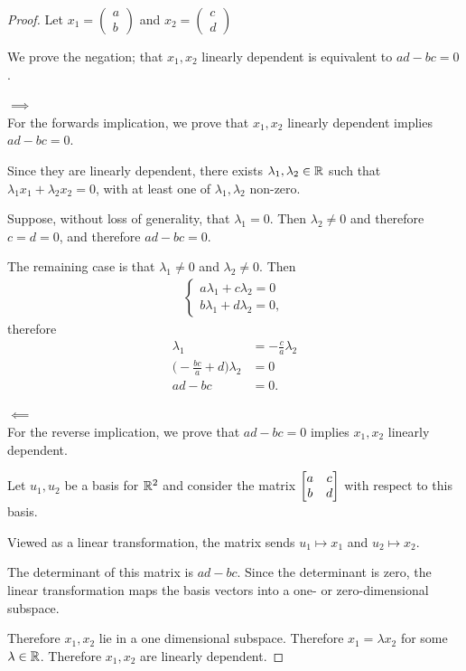 \documentclass[12pt]{article}
\begin{document}
\renewcommand{\cvec}[2]{\begin{pmatrix}#1\\#2\end{pmatrix}}

\begin{proof}
Let $x_1 = \cvec{a}{b}$ and $x_2 = \cvec{c}{d}$

We prove the negation; that $x_1, x_2$ linearly dependent is equivalent to
$ad - bc = 0$.

$\implies$\\
For the forwards implication, we prove that $x_1, x_2$ linearly dependent
implies $ad - bc = 0$.

Since they are linearly dependent, there exists $\lambda_1, \lambda_2 \in \mathbb{R}$
such that $\lambda_1x_1 + \lambda_2x_2 = 0$, with at least one of
$\lambda_1, \lambda_2$ non-zero.

Suppose, without loss of generality, that $\lambda_1 = 0$. Then
$\lambda_2 \neq 0$ and therefore $c = d = 0$, and therefore $ad - bc = 0$.

The remaining case is that $\lambda_1 \neq 0$ and $\lambda_2 \neq 0$. Then
\begin{align*}
  \begin{cases}
    a\lambda_1 + c\lambda_2 = 0\\
    b\lambda_1 + d\lambda_2 = 0,
  \end{cases}
\end{align*}
therefore
\begin{align*}
  \lambda_1                            &= -\frac{c}{a}\lambda_2\\
  \Big(-\frac{bc}{a} + d\Big)\lambda_2 &= 0\\
  ad - bc                              &= 0.
\end{align*}

$\impliedby$\\
For the reverse implication, we prove that $ad - bc = 0$ implies $x_1, x_2$
linearly dependent.


Let $u_1, u_2$ be a basis for $\mathbb{R}^2$ and consider the matrix
$\begin{bmatrix}a & c\\b & d\\ \end{bmatrix}$ with respect to this basis.

Viewed as a linear transformation, the matrix sends $u_1 \mapsto x_1$ and
$u_2 \mapsto x_2$.

The determinant of this matrix is $ad - bc$. Since the determinant is zero, the
linear transformation maps the basis vectors into a one- or zero-dimensional
subspace.

Therefore $x_1,x_2$ lie in a one dimensional subspace. Therefore
$x_1 = \lambda x_2$ for some $\lambda \in \mathbb{R}$. Therefore $x_1,x_2$ are linearly
dependent.

\end{proof}
\end{document}
